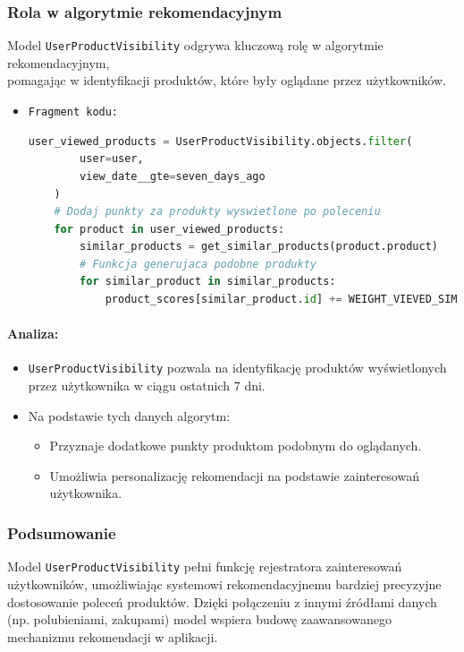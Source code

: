 \documentclass[12pt,a4paper,oneside]{article}
\theoremstyle{definition}
\numberwithin{equation}{section}
\begin{document}
\subsubsection{Rola w algorytmie rekomendacyjnym}
Model \texttt{UserProductVisibility} odgrywa kluczową rolę w algorytmie rekomendacyjnym, 
\\pomagając w identyfikacji produktów, które były oglądane przez użytkowników. 

\begin{itemize}
    \item \texttt{Fragment kodu:}
        \begin{lstlisting}[language=Python, caption={Fragment \texttt{get_recommended_products}}]
    user_viewed_products = UserProductVisibility.objects.filter(
        user=user,
        view_date__gte=seven_days_ago
    )
    # Dodaj punkty za produkty wyswietlone po poleceniu
    for product in user_viewed_products:
        similar_products = get_similar_products(product.product)  
        # Funkcja generujaca podobne produkty
        for similar_product in similar_products:
            product_scores[similar_product.id] += WEIGHT_VIEVED_SIMILAR_PRODUCT
        \end{lstlisting}
\end{itemize}



\paragraph{Analiza:}
\begin{itemize}
    \item \texttt{UserProductVisibility} pozwala na identyfikację produktów wyświetlonych przez użytkownika w ciągu ostatnich 7 dni.
    \item Na podstawie tych danych algorytm:
    \begin{itemize}
        \item Przyznaje dodatkowe punkty produktom podobnym do oglądanych.
        \item Umożliwia personalizację rekomendacji na podstawie zainteresowań użytkownika.
    \end{itemize}
\end{itemize}

\subsubsection{Podsumowanie}
Model \texttt{UserProductVisibility} pełni funkcję rejestratora zainteresowań użytkowników, umożliwiając systemowi rekomendacyjnemu bardziej precyzyjne dostosowanie poleceń produktów. Dzięki połączeniu z innymi źródłami danych (np. polubieniami, zakupami)
 model wspiera budowę zaawansowanego mechanizmu rekomendacji w aplikacji.
\end{document}
